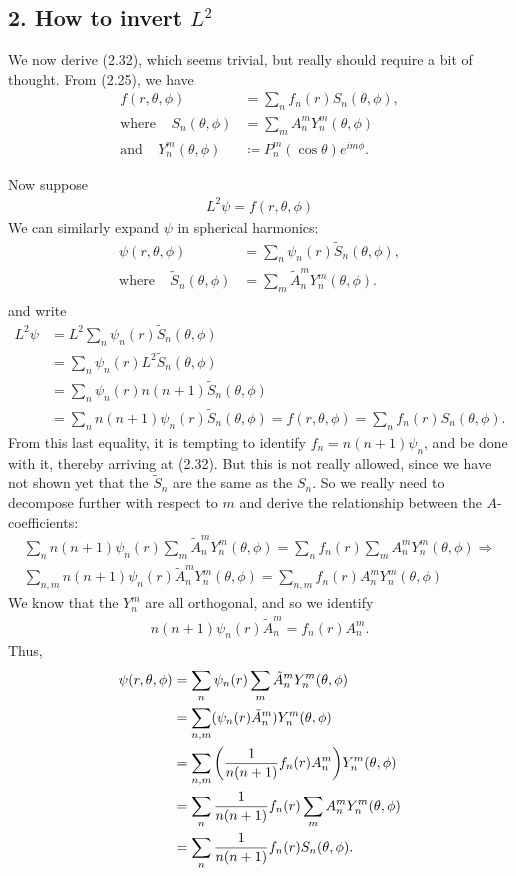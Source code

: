\documentclass[12pt]{article} %
\newcommand{\andd}{\text{and}\ \ \ \ \ }
\newcommand{\five}{\ \ \ \ \ }
\begin{document}
\subsection*{2. How to invert $L^2$}
We now derive (2.32), which seems trivial, but really should require a bit of thought. From (2.25), we have
\begin{align*}
f(r,\theta,\phi) &= \sum_n f_n(r)S_n(\theta,\phi),\\
\text{where}\five S_n(\theta,\phi) &= \sum_m A_n^m Y_n^m(\theta,\phi)\\
\andd Y_n^m(\theta,\phi) &\coloneqq P_n^m(\cos\theta)e^{im\phi}.
\end{align*}

Now suppose
\begin{align*}
L^2\psi = f(r,\theta,\phi)
\end{align*}
We can similarly expand $\psi$ in spherical harmonics:
\begin{align*}
\psi(r,\theta,\phi) &= \sum_n \psi_n(r)\tilde{S}_n(\theta,\phi),\\
\text{where}\five \tilde{S}_n(\theta,\phi) &= \sum_m \tilde{A}_n^m Y_n^m(\theta,\phi).\\
\end{align*}
and write
\begin{align*}
L^2\psi &= L^2\sum_n \psi_n(r)\tilde{S}_n(\theta,\phi)\\
			&= \sum_n \psi_n(r)L^2\tilde{S}_n(\theta,\phi)\\
			&= \sum_n \psi_n(r)n(n+1)\tilde{S}_n(\theta,\phi)\\
			&= \sum_n n(n+1)\psi_n(r)\tilde{S}_n(\theta,\phi) = f(r,\theta,\phi) = \sum_n f_n(r)S_n(\theta,\phi).
\end{align*}
From this last equality, it is tempting to identify $f_n = n(n+1)\psi_n$, and be done with it, thereby arriving at (2.32). But this is not really allowed, since we have not shown yet that the $\tilde{S}_n$ are the same as the $S_n$. So we really need to decompose further with respect to $m$ and derive the relationship between the $A$-coefficients:
\begin{align*}
\sum_n n(n+1)\psi_n(r)\sum_m \tilde{A}_n^mY_n^m(\theta,\phi)  = \sum_n f_n(r)\sum_mA_n^mY_n^m(\theta,\phi)\Longrightarrow\\
\sum_{n,m} n(n+1)\psi_n(r) \tilde{A}_n^mY_n^m(\theta,\phi)  = \sum_{n,m} f_n(r)A_n^mY_n^m(\theta,\phi)
\end{align*}
We know that the $Y_n^m$ are all orthogonal, and so we identify
\begin{align*}
n(n+1)\psi_n(r) \tilde{A}_n^m = f_n(r)A_n^m.
\end{align*}
Thus,
\begin{align*}
\psi(r,\theta,\phi) &= \sum_n\psi_n(r)\sum_m\tilde{A}_n^m Y_n^m(\theta,\phi)\\
&= \sum_{n,m}(\psi_n(r)\tilde{A}_n^m)Y_n^m(\theta,\phi)\\
&= \sum_{n,m}\bigg{(}\frac{1}{n(n+1)}f_n(r)A_n^m\bigg{)}Y_n^m(\theta,\phi)\\
&= \sum_n \frac{1}{n(n+1)}f_n(r)\sum_m A_n^mY_n^m(\theta,\phi)\\
&= \sum_n\frac{1}{n(n+1)}f_n(r)S_n(\theta,\phi).
\end{align*}
\end{document}
